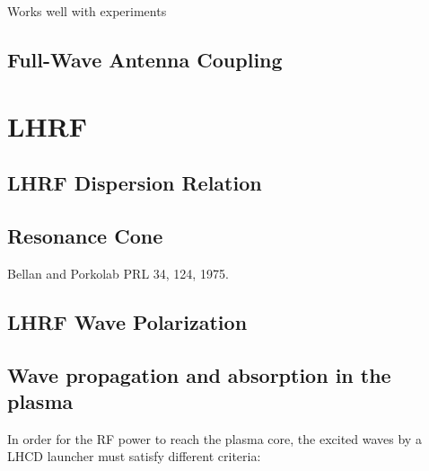 Works well with experiments

\subsection{Full-Wave Antenna Coupling}\label{sec:ICRH_FW_antena_coupling}





\section{LHRF}\label{sec:lhcd}

\subsection{LHRF Dispersion Relation}

\subsection{Resonance Cone}
Bellan and Porkolab PRL 34, 124, 1975.

\subsection{LHRF Wave Polarization}


\subsection{Wave propagation and absorption in the plasma}
In order for the RF power to reach the plasma core, the excited waves by a LHCD launcher must satisfy different criteria: 

